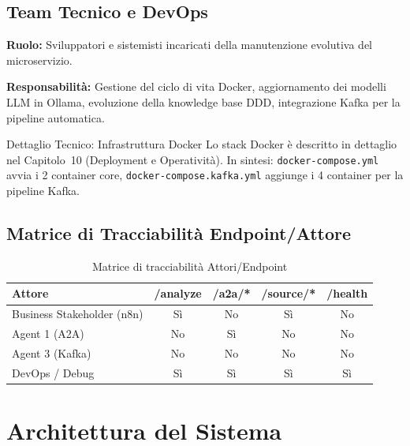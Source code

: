 \documentclass[12pt,a4paper]{report}
\begin{document}
\section{Team Tecnico e DevOps}

\textbf{Ruolo:} Sviluppatori e sistemisti incaricati della manutenzione evolutiva
del microservizio.

\textbf{Responsabilità:} Gestione del ciclo di vita Docker, aggiornamento dei
modelli LLM in Ollama, evoluzione della knowledge base DDD, integrazione Kafka
per la pipeline automatica.

\begin{technicalbox}{Dettaglio Tecnico: Infrastruttura Docker}
Lo stack Docker è descritto in dettaglio nel Capitolo~10 (Deployment e Operatività).
In sintesi: \texttt{docker-compose.yml} avvia i 2 container core,
\texttt{docker-compose.kafka.yml} aggiunge i 4 container per la pipeline Kafka.
\end{technicalbox}

\section{Matrice di Tracciabilità Endpoint/Attore}

\begin{table}[H]
\centering
\renewcommand{\arraystretch}{1.3}
\begin{tabular}{lcccc}
\toprule
\textbf{Attore} & \textbf{/analyze} & \textbf{/a2a/*} & \textbf{/source/*} & \textbf{/health} \\
\midrule
Business Stakeholder (n8n) & Sì & No  & Sì  & No  \\
Agent 1 (A2A)              & No & Sì  & No  & No  \\
Agent 3 (Kafka)            & No & No  & No  & No  \\
DevOps / Debug             & Sì & Sì  & Sì  & Sì  \\
\bottomrule
\end{tabular}
\caption{Matrice di tracciabilità Attori/Endpoint}
\label{tab:matrix-endpoints}
\end{table}

\chapter{Architettura del Sistema}
\end{document}
